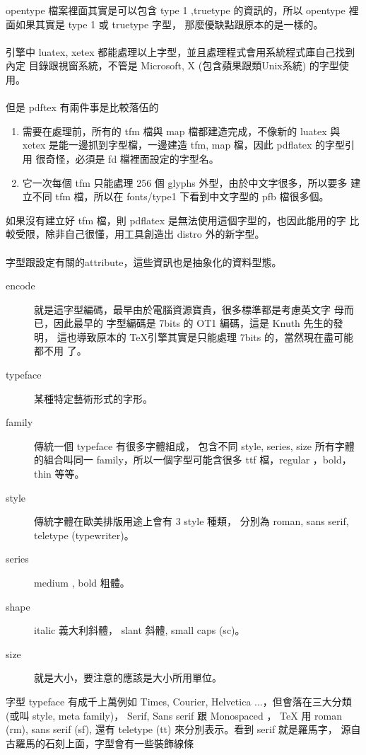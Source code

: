 opentype 檔案裡面其實是可以包含 type 1 ,truetype 的資訊的，所以 opentype
裡面如果其實是 type 1 或 truetype 字型， 那麼優缺點跟原本的是一樣的。
\\\\
引擎中 luatex, xetex 都能處理以上字型，並且處理程式會用系統程式庫自己找到內定
目錄跟視窗系統，不管是 Microsoft, X (包含蘋果跟類Unix系統) 的字型使用。
\\\\
但是 pdftex 有兩件事是比較落伍的
\begin{enumerate}
  \item 需要在處理前，所有的 tfm 檔與 map 檔都建造完成，不像新的 luatex 與
    xetex 是能一邊抓到字型檔，一邊建造 tfm, map 檔，因此 pdflatex 的字型引用
    很奇怪，必須是 fd 檔裡面設定的字型名。
  \item 它一次每個 tfm 只能處理 256 個 glyphs 外型，由於中文字很多，所以要多
    建立不同 tfm 檔，所以在 fonts/type1 下看到中文字型的 pfb 檔很多個。
\end{enumerate}
如果沒有建立好 tfm 檔，則 pdflatex 是無法使用這個字型的，也因此能用的字
比較受限，除非自己很懂，用工具創造出 distro 外的新字型。
\\\\
字型跟設定有關的attribute，這些資訊也是抽象化的資料型態。
\begin{description}
  \item [encode] 就是這字型編碼，最早由於電腦資源寶貴，很多標準都是考慮英文字
    母而已，因此最早的 \MF{} 字型編碼是 7bits 的 OT1 編碼，這是 Knuth 先生的發
    明， 這也導致原本的 \TeX 引擎其實是只能處理 7bits 的，當然現在盡可能都不用
    了。
  \item [typeface] 某種特定藝術形式的字形。
  \item [family] 傳統一個 typeface 有很多字體組成， 包含不同 style, series,
    size 所有字體的組合叫同一 family，所以一個字型可能含很多 ttf 檔，regular
    ，bold，thin 等等。
  \item [style] 傳統字體在歐美排版用途上會有 3 style 種類， 分別為 roman,
    sans serif, teletype (typewriter)。
  \item [series] medium , bold 粗體。
  \item [shape] italic 義大利斜體， slant 斜體, small caps (sc)。
  \item [size] 就是大小，要注意的應該是大小所用單位。
\end{description}
字型 typeface 有成千上萬例如 Times, Courier, Helvetica ...，但會落在三大分類
(或叫 style, meta family)， Serif, Sans serif 跟 Monospaced ， {\TeX} 用 roman
(rm), sans serif (sf), 還有 teletype (tt) 來分別表示。看到 serif 就是羅馬字，
源自古羅馬的石刻上面，字型會有一些裝飾線條

